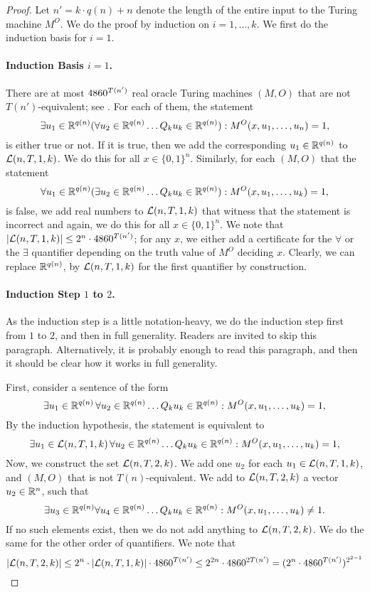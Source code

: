 \documentclass{article}
\begin{document}
\begin{proof}
    Let $n'=k \cdot q(n) +n$ denote the length of the entire input to the Turing machine $M^O$.
    We do the proof by induction on $i = 1, \ldots,k$.
    We first do the induction basis for $i=1$.
    
    \paragraph{Induction Basis $i=1$.} 
    There are at most  $4860^{T(n')}$  real oracle Turing machines $(M,O)$ that are not $T(n')$-equivalent; see .
    For each of them, the statement 
    \[\exists u_1 \in \mathbb{R}^{q(n)} (\forall u_2 \in \mathbb{R}^{q(n)} \ldots Q_k u_k \in \mathbb{R}^{q(n)}): M^O(x, u_1,\ldots,u_n) = 1,\]
    is either true or not.
    If it is true, then we add the corresponding $u_1 \in \mathbb{R}^{q(n)}$ to $\mathcal{L}(n,T,1,k)$. We do this for all $x \in \{0,1\}^n$.
    Similarly, for each $(M,O)$ that the statement 
    \[\forall u_1 \in \mathbb{R}^{q(n)}  (\exists u_2 \in \mathbb{R}^{q(n)} \ldots Q_k u_k \in \mathbb{R}^{q(n)}): M^O(x, u_1,\ldots,u_k) = 1,\]
    is false, we add real numbers to $\mathcal{L}(n,T,1,k)$ that witness that the statement is incorrect and again, we do this for all $x \in \{0,1\}^n$.
    We note that $|\mathcal{L}(n,T,1,k)| \leq 2^n  \cdot 4860^{T(n')}$; 
    for any $x$, we either add a certificate for the $\forall$ or the $\exists$ quantifier depending on the truth value of $M^O$ deciding $x$.
    Clearly, we can replace $\mathbb{R}^{q(n)}$, by $\mathcal{L}(n,T,1,k)$ for the first quantifier by construction.
    
    \paragraph{Induction Step $1$ to $2$.}
    As the induction step is a little notation-heavy, we do the induction step first from $1$ to $2$, and then in full generality.
    Readers are invited to skip this paragraph.
    Alternatively, it is probably enough to read this paragraph, and then it should be clear how it works in full generality.
    
    First, consider a sentence of the form
    \[\exists u_1 \in \mathbb{R}^{q(n)} \, \forall u_2\in \mathbb{R}^{q(n)}  \ldots Q_k u_k \in \mathbb{R}^{q(n)}: M^O(x, u_1,\ldots,u_k) = 1,\]
    By the induction hypothesis, the statement is equivalent to
    \[\exists u_1 \in \mathcal{L}(n,T,1,k)  \, \forall u_2 \in \mathbb{R}^{q(n)}  \ldots  Q_k u_k \in \mathbb{R}^{q(n)} : M^O(x, u_1,\ldots,u_k) = 1,\]
    Now, we construct the set $\mathcal{L}(n,T,2,k)$.
    We add one $u_2$ for each $u_1\in \mathcal{L}(n,T,1,k)$,
    and $(M,O)$ that is not $T(n)$-equivalent.
    We add to  $\mathcal{L}(n,T,2,k)$ a vector $u_2\in \mathbb{R}^n$,
    such that \[\exists u_3 \in \mathbb{R}^{q(n)} \forall u_4\in \mathbb{R}^{q(n)} \ldots  Q_k u_k \in \mathbb{R}^{q(n)} :M^O(x,u_1,\ldots,u_k) \neq 1.\]
    If no such elements exist, then we do not add anything to $\mathcal{L}(n,T,2,k)$.
    We do the same for the other order of quantifiers.
    We note that \[|\mathcal{L}(n,T,2,k)| \leq 2^n \cdot |\mathcal{L}(n,T,1,k)| \cdot 4860^{T(n')} \leq 2^{2n} \cdot 4860^{2T(n')} = (2^n \cdot 4860^{T(n')})^{2^{2-1}}\]

\end{proof}
\end{document}
